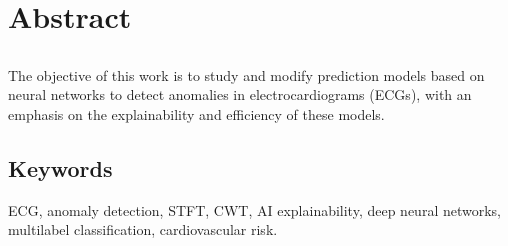\chapter*{Abstract}

\section*{\tituloPortadaEngVal}

The objective of this work is to study and modify prediction models based on neural networks to detect anomalies in electrocardiograms (ECGs), with an emphasis on the explainability and efficiency of these models.

\section*{Keywords}

ECG, anomaly detection, STFT, CWT, AI explainability, deep neural networks, multilabel classification, cardiovascular risk.

